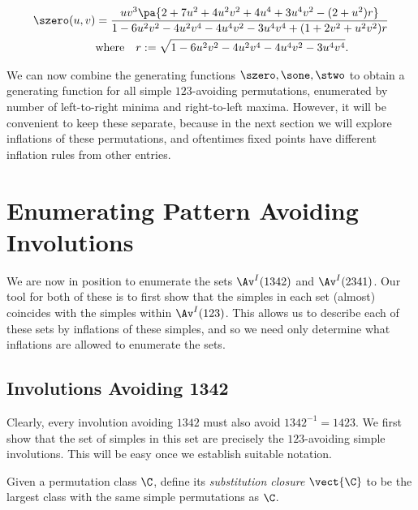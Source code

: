 \documentclass[12pt,twoside]{memoir}
\begin{document}
    \begin{equation} \label{involutions:eqn:stwo}
      \begin{split}
      \szero(u,v)
      &= \frac{uv^3\pa{2+7u^2+4u^2v^2+4u^4+3u^4v^2-(2+u^2)r}}
      {1-6u^2v^2-4u^2v^4-4u^4v^2-3u^4v^4+(1+2v^2+u^2v^2)r} \\
      &\text{where} \quad r := \sqrt{1-6u^2v^2-4u^2v^4-4u^4v^2-3u^4v^4}.
      \end{split}
    \end{equation}
      

    We can now combine the generating functions $\szero, \sone, \stwo$ to obtain
    a generating function for all simple $123$-avoiding permutations, enumerated
    by number of left-to-right minima and right-to-left maxima. However, it will
    be convenient to keep these separate, because in the next section we will
    explore inflations of these permutations, and oftentimes fixed points have
    different inflation rules from other entries. 
         
        




  \section{Enumerating Pattern Avoiding Involutions}
  \label{involutions:sec:enumerations}
    
    We are now in position to enumerate the sets $\Av^I(1342)$ and $\Av^I(2341)$.
    Our tool for both of these is to first show that the simples in each set
    (almost) coincides with the simples within $\Av^I(123)$. This allows us to
    describe each of these sets by inflations of these simples, and so we need
    only determine what inflations are allowed to enumerate the sets. 


    \subsection{Involutions Avoiding 1342}
    \label{involutions:sub:1342}

      Clearly, every involution avoiding $1342$ must also avoid $1342^{-1} =
      1423$. We first show that the set of simples in this set are precisely
      the $123$-avoiding simple involutions. This will be easy once we establish
      suitable notation. 

      \begin{definition} \label{involutions:def:subs-closure}
        Given a permutation class $\C$, define its \emph{substitution closure}
        $\vect{\C}$ to be the largest class with the same simple permutations as
        $\C$. 
      \end{definition}
\end{document}
